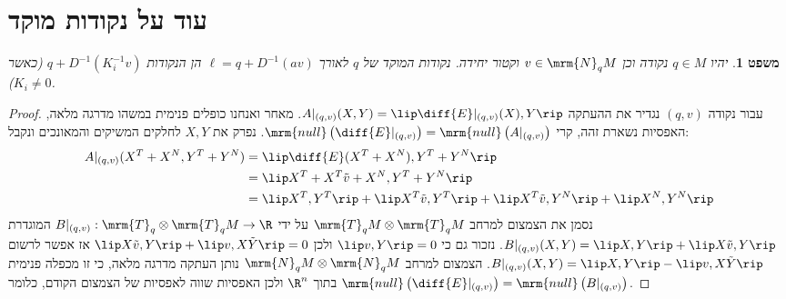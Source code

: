 \documentclass{article}
\newtheorem*{theorem*}{משפט}
\theoremstyle{definition}
\begin{document}
	\section{עוד על נקודות מוקד}
	
	\begin{theorem*}
		יהיו
		\(q\in M\)
		נקודה וכן
		\(v\in\mrm{N}_q M\)
		וקטור יחידה.
		נקודות המוקד של \(q\) לאורך
		\(\ell = q+D^{-1}(av)\)
		הן הנקודות
		\(q + D^{-1}(K_i^{-1} v)\)
		(כאשר \(K_i\neq 0\)).
	\end{theorem*}

	\begin{proof}
		עבור נקודה
		\((q,v)\)
		נגדיר את ההעתקה
		\(A|_{(q,v)}(X,Y)=\lip \diff{E}|_{(q,v)}(X),Y \rip\).
		מאחר ואנחנו כופלים פנימית במשהו מדרגה מלאה, האפסיות נשארת זהה, קרי
		\(
			\mrm{null}\left(\diff{E}|_{(q,v)}\right)
			=\mrm{null}\left(A|_{(q,v)}\right)
		\).
		נפרק את \(X,Y\) לחלקים המשיקים והמאונכים ונקבל:
		\begin{equation*}\begin{split}
			A|_{(q,v)}(X^T+X^N,Y^T+Y^N)
			&= \lip \diff{E}(X^T+X^N),Y^T+Y^N \rip
			\\&= \lip X^T+X^T\tilde{v} +X^N ,Y^T+Y^N \rip
			\\&= \lip X^T,Y^T \rip + \lip X^T\tilde{v},Y^T \rip
			+ \lip X^T\tilde{v},Y^N \rip + \lip X^N,Y^N \rip
		\end{split}\end{equation*}
		נסמן את הצמצום למרחב
		\(\mrm{T}_q M \otimes \mrm{T}_q M\)
		על ידי
		\(B|_{(q,v)}: \mrm{T}_q \otimes \mrm{T}_q M \to \R\)
		המוגדרת
		\(B|_{(q,v)}(X,Y) = \lip X,Y \rip + \lip X\tilde{v},Y \rip\).
		נזכור גם כי
		\(\lip v,Y \rip=0\)
		ולכן
		\(
			\lip X\tilde{v},Y \rip + \lip v,X\tilde{Y} \rip=0
		\)
		אז אפשר לרשום
		\(B|_{(q,v)}(X,Y) = \lip X,Y \rip - \lip v,X\tilde{Y} \rip\).
		הצמצום למרחב
		\(\mrm{N}_q M \otimes \mrm{N}_q M\)
		נותן העתקה מדרגה מלאה, כי זו מכפלה פנימית בתוך
		\(\R^n\)
		ולכן האפסיות שווה לאפסיות של הצמצום הקודם, כלומר
		\(
			\mrm{null}\left(\diff{E}|_{(q,v)}\right)
			=\mrm{null}\left(B|_{(q,v)}\right)
		\).
	\end{proof}
\end{document}
